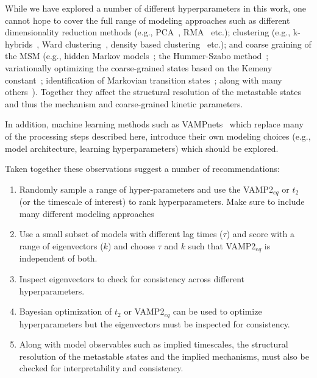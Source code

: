 \documentclass[journal=jacsat,manuscript=article]{achemso}
\begin{document}
While we have explored a number of different hyperparameters in this work, one cannot hope to cover the full range of modeling approaches such as different dimensionality reduction methods (e.g., PCA~\cite{nagelSelectingFeaturesMarkov2023}, RMA~\cite{mitsutakeRelaxationModeAnalysis2018} etc.); clustering (e.g., k-hybrids~\cite{porterEnsparaModelingMolecular2019}, Ward clustering~\cite{Ward_Clust2017}, density based clustering~\cite{nagelSelectingFeaturesMarkov2023} etc.); and coarse graining of the MSM (e.g., hidden Markov models~\cite{noeProjectedHiddenMarkov2013a}; the Hummer-Szabo method~\cite{hummerOptimalDimensionalityReduction2015}; variationally optimizing the coarse-grained states based on the Kemeny constant~\cite{koskinVariationalKineticClustering2023}; identification of Markovian transition states~\cite{martiniVariationalIdentificationMarkovian2017}; along with many others~\cite{orioliDimensionalReductionMarkov2016, jainIdentifyingMetastableStates2012, bowmanImprovedCoarsegrainingMarkov2012}). Together they affect the structural resolution of the metastable states and thus the mechanism and coarse-grained kinetic parameters. 

In addition, machine learning methods such as VAMPnets~\cite{VAMPnets_f2018} which replace many of the processing steps described here, introduce their own modeling choices (e.g., model architecture, learning hyperparameters) which should be explored.  

Taken together these observations suggest a number of recommendations: 

\begin{enumerate}
    \item Randomly sample a range of hyper-parameters and use the VAMP2$_{eq}$ or $t_2$ (or the timescale of interest) to rank hyperparameters. Make sure to include many different modeling approaches
    \item Use a small subset of models with different lag times ($\tau$) and score with a range of eigenvectors ($k$) and choose $\tau$ and $k$ such that VAMP2$_{eq}$ is independent of both.  
    \item Inspect eigenvectors to check for consistency across different hyperparameters. 
    \item Bayesian optimization of $t_2$ or VAMP2$_{eq}$ can be used to optimize hyperparameters but the eigenvectors must be inspected for consistency.  
    \item Along with model observables such as implied timescales, the structural resolution of the metastable states and the implied mechanisms, must also be checked for interpretability and consistency. 
\end{enumerate}
\end{document}
